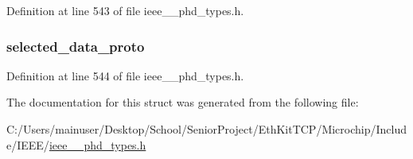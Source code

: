 Definition at line 543 of file ieee\+\_\+\_\+phd\+\_\+types.\+h.

\hypertarget{struct___a_a_r_e__apdu_a6c320a2b89fb315ce2bf7c0f3201116a}{}
\subsubsection[{selected\+\_\+data\+\_\+proto}]{ selected\+\_\+data\+\_\+proto}\label{struct___a_a_r_e__apdu_a6c320a2b89fb315ce2bf7c0f3201116a}


Definition at line 544 of file ieee\+\_\+\_\+phd\+\_\+types.\+h.



The documentation for this struct was generated from the following file\+:\begin{DoxyCompactItemize}
\item 
C\+:/\+Users/mainuser/\+Desktop/\+School/\+Senior\+Project/\+Eth\+Kit\+T\+C\+P/\+Microchip/\+Include/\+I\+E\+E\+E/\hyperlink{ieee__11073__phd__types_8h}{ieee\+\_\+\_\+phd\+\_\+types.\+h}\end{DoxyCompactItemize}
